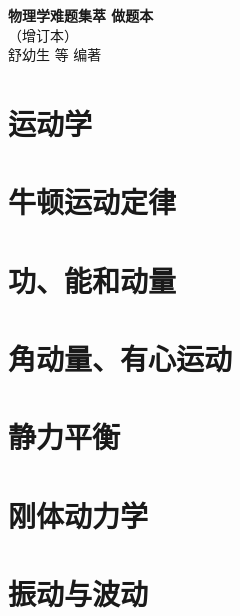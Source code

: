 \documentclass[12pt]{book}
\begin{document}
\thispagestyle{empty}
\begin{titlepage}
\begin{center}
\vspace*{3cm}
{\Huge\bfseries 物理学难题集萃 做题本}\\
\vspace{2cm}
{（增订本）}\\
\vspace{0.3cm}
{舒幼生 等 编著}\\
\vspace{2cm}
\end{center}
\end{titlepage}

\chapter{运动学}
\newpage



\chapter{牛顿运动定律}
\newpage



\chapter{功、能和动量}
\newpage



\chapter{角动量、有心运动}
\newpage



\chapter{静力平衡}
\newpage



\chapter{刚体动力学}
\newpage



\chapter{振动与波动}
\newpage

\end{document}
